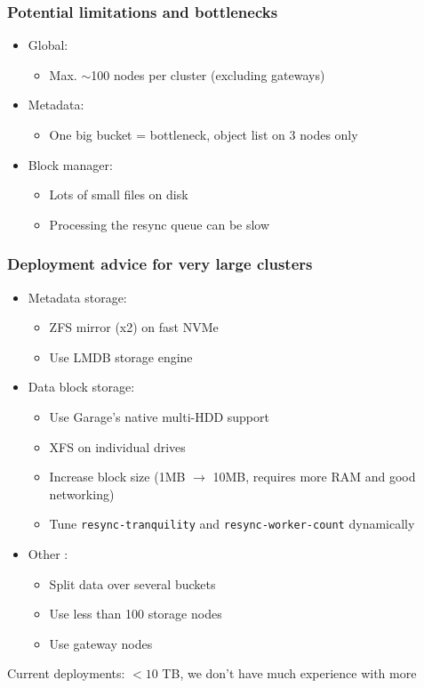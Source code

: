 \documentclass[aspectratio=169]{beamer}
\begin{document}
\begin{frame}
	\frametitle{Potential limitations and bottlenecks}
	\begin{itemize}
		\item Global:
			\begin{itemize}
				\item Max. $\sim$100 nodes per cluster (excluding gateways)
			\end{itemize}
			\vspace{1em}
		\item Metadata:
			\begin{itemize}
				\item One big bucket = bottleneck, object list on 3 nodes only
			\end{itemize}
			\vspace{1em}
		\item Block manager:
			\begin{itemize}
				\item Lots of small files on disk
				\item Processing the resync queue can be slow
			\end{itemize}
	\end{itemize}
\end{frame}

\begin{frame}
	\frametitle{Deployment advice for very large clusters}
	\begin{itemize}
		\item Metadata storage:
			\begin{itemize}
				\item ZFS mirror (x2) on fast NVMe
				\item Use LMDB storage engine
			\end{itemize}
			\vspace{.5em}
		\item Data block storage:
			\begin{itemize}
				\item Use Garage's native multi-HDD support
				\item XFS on individual drives
				\item Increase block size (1MB $\to$ 10MB, requires more RAM and good networking)
				\item Tune \texttt{resync-tranquility} and \texttt{resync-worker-count} dynamically
			\end{itemize}
			\vspace{.5em}
		\item Other :
			\begin{itemize}
				\item Split data over several buckets
				\item Use less than 100 storage nodes
				\item Use gateway nodes
			\end{itemize}
			\vspace{.5em}
	\end{itemize}
	Current deployments: $< 10$ TB, we don't have much experience with more
\end{frame}
\end{document}
